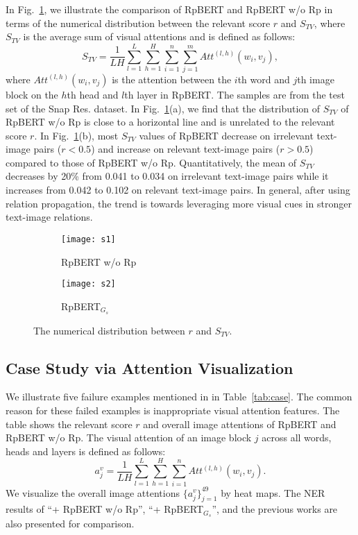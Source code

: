 \documentclass[letterpaper]{article} \usepackage{aaai21}  \usepackage{times}  \usepackage{helvet} \usepackage{courier}  \usepackage[hyphens]{url}  \usepackage{graphicx} \urlstyle{rm} \def\UrlFont{\rm}  \usepackage{natbib}  \usepackage{caption} \frenchspacing  \setlength{\pdfpagewidth}{8.5in}  \setlength{\pdfpageheight}{11in}
\begin{document}
In Fig.~\ref{fig:scorev}, we illustrate the comparison of RpBERT and RpBERT w/o Rp in terms of the numerical distribution between the relevant score $r$ and $S_{TV}$, where $S_{TV}$ is the average sum of visual attentions and is defined as follows:
\begin{equation}
S_{TV} = \frac{1}{LH}\sum^{L}_{l=1}\sum^{H}_{h=1}\sum^{n}_{i=1}\sum^{m}_{j=1}Att^{(l,h)}(w_i,v_j),
\end{equation}
where $Att^{(l,h)}(w_i,v_j)$ is the attention between the $i$th word and $j$th image block on the $h$th head and $l$th layer in RpBERT.
The samples are from the test set of the Snap Res. dataset.
In Fig.~\ref{fig:scorev}(a), we find that the distribution of $S_{TV}$ of RpBERT w/o Rp is close to a horizontal line and is unrelated to the relevant score $r$.
In Fig.~\ref{fig:scorev}(b), most $S_{TV}$ values of RpBERT decrease on irrelevant text-image pairs ($r<0.5$) and increase on relevant text-image pairs ($r>0.5$) compared to those of RpBERT w/o Rp.
Quantitatively, the mean of  $S_{TV}$  decreases by 20\% from 0.041 to 0.034 on irrelevant text-image pairs 
while it increases from 0.042 to  0.102 on relevant text-image pairs.
In general, after using relation propagation, the trend is towards leveraging more visual cues in stronger text-image relations.



\begin{figure}[tb]
\centering
\begin{subfigure}{0.23\textwidth}
	\centering
	\texttt{[image: s1]}
	\caption{RpBERT w/o Rp}
\end{subfigure}
\begin{subfigure}{0.23\textwidth}
	\centering
	\texttt{[image: s2]}
	\caption{RpBERT$_{G_s}$}
\end{subfigure}
\caption{The numerical distribution between $r$ and $S_{TV}$.}
\label{fig:scorev}
\end{figure}











\subsection{Case Study via Attention Visualization}
We illustrate five failure examples mentioned in \cite{lu2018visual,arshad2019aiding,yu2020improving} in Table~\ref{tab:case}.
The common reason for these failed examples is inappropriate visual attention features.
The table shows the relevant score $r$ and overall image attentions of RpBERT and RpBERT w/o Rp.
The visual attention of an image block $j$ across all words, heads and layers is defined as follows:
\begin{equation}
a^v_j=\frac{1}{LH}\sum^{L}_{l=1}\sum^{H}_{h=1}\sum^{n}_{i=1}Att^{(l,h)}(w_i,v_j).
\end{equation}
We visualize the overall image attentions $\{a^v_j\}^{49}_{j=1}$ by heat maps.
The NER results of ``+ RpBERT w/o Rp'', ``+ RpBERT$_{G_s}$'', and the previous works are also presented for comparison.
\end{document}
